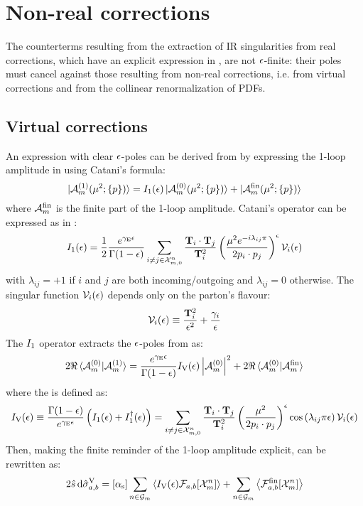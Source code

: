 \section{Non-real corrections}

The counterterms resulting from the extraction of IR singularities from real corrections, which have an explicit expression in , are not $ \epsilon $-finite: their poles must cancel against those resulting from non-real corrections, i.e. from virtual corrections and from the collinear renormalization of PDFs.

\subsection{Virtual corrections}

An expression with clear $ \epsilon $-poles can be derived from  by expressing the 1-loop amplitude in  using Catani's formula:
\begin{equation}
  \ket{\mathcal{A}_m^{(1)}(\mu^2 ; \{p\})} = I_1(\epsilon) \ket{\mathcal{A}_m^{(0)}(\mu^2 ; \{p\})} + \ket{\mathcal{A}_m^\text{fin}(\mu^2 ; \{p\})}
\end{equation}
where $ \mathcal{A}_m^\text{fin} $ is the finite part of the 1-loop amplitude. Catani's operator can be expressed as in \cite{Catani-1998}:
\begin{equation}
  I_1(\epsilon) = \frac{1}{2} \frac{e^{\gamma_\text{E}\epsilon}}{\Gamma(1-\epsilon)} \sum_{i \neq j \in \mathcal{X}^{n}_{m,0}} \frac{\mathbf{T}_i \cdot \mathbf{T}_j}{\mathbf{T}_i^2} \left( \frac{\mu^2 e^{-i \lambda_{ij} \pi}}{2p_i \cdot p_j} \right)^\epsilon \mathcal{V}_i(\epsilon)
\end{equation}
with $ \lambda_{ij} = +1 $ if $ i $ and $ j $ are both incoming/outgoing and $ \lambda_{ij} = 0 $ otherwise. The singular function $ \mathcal{V}_i(\epsilon) $ depends only on the parton's flavour:
\begin{equation}
  \mathcal{V}_i(\epsilon) \equiv \frac{\mathbf{T}_i^2}{\epsilon^2} + \frac{\gamma_i}{\epsilon}
\end{equation}
The $ I_1 $ operator extracts the $ \epsilon $-poles from  as:
\begin{equation*}
  2\Re \braket{\mathcal{A}_m^{(0)} | \mathcal{A}_m^{(1)}} = \frac{e^{\gamma_\text{E}\epsilon}}{\Gamma(1-\epsilon)} I_\text{V}(\epsilon) \left\lvert\mathcal{A}_m^{(0)}\right\rvert^2 + 2\Re \braket{\mathcal{A}_m^{(0)} | \mathcal{A}_m^\text{fin}}
\end{equation*}
where the  is defined as:
\begin{equation}
  I_\text{V}(\epsilon) \equiv \frac{\Gamma(1-\epsilon)}{e^{\gamma_\text{E}\epsilon}} \left( I_1(\epsilon) + I_1^\dagger(\epsilon) \right) = \sum_{i \neq j \in \mathcal{X}^{n}_{m,0}} \frac{\mathbf{T}_i \cdot \mathbf{T}_j}{\mathbf{T}_i^2} \left( \frac{\mu^2}{2p_i \cdot p_j} \right)^\epsilon \cos \left( \lambda_{ij} \pi \epsilon \right) \mathcal{V}_i(\epsilon)
\end{equation}
Then, making the finite reminder of the 1-loop amplitude explicit,  can be rewritten as:
\begin{equation}
  2\hat{s}\, \mathrm{d}\hat{\sigma}_{a,b}^\text{V} = [\alpha_\text{s}] \sum_{n \in \mathcal{G}_m} \left\langle I_\text{V}(\epsilon) \mathcal{F}_{a,b}[\mathcal{X}^{n}_{m}] \right\rangle + \sum_{n \in \mathcal{G}_m} \left\langle \mathcal{F}_{a,b}^\text{fin}[\mathcal{X}^{n}_{m}] \right\rangle
\end{equation}

